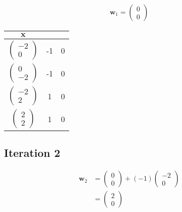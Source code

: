 \documentclass[11pt, a4paper]{article}
\begin{document}
\begin{align*}
	\boldsymbol{w}_1 = \begin{pmatrix} 0 \\ 0 \end{pmatrix}
\end{align*}

\begin{table}[htbp]
	\centering
	\begin{tabular}{|c|c|c|}
		\toprule
		$\boldsymbol{x}$    \\
		\midrule
		$\begin{pmatrix} -2 \\ 0 \end{pmatrix}$ & -1 & 0 \\
		$\begin{pmatrix} 0  \\ -2 \end{pmatrix}$ & -1 & 0 \\
		$\begin{pmatrix} -2 \\ 2 \end{pmatrix}$ & 1 & 0 \\
		$\begin{pmatrix} 2  \\ 2 \end{pmatrix}$ & 1 & 0 \\
		\hline
	\end{tabular}
\end{table}

\subsection{Iteration 2}

\begin{align*}
	\boldsymbol{w}_2 & = \begin{pmatrix} 0 \\ 0 \end{pmatrix} + (-1)  \begin{pmatrix} -2 \\ 0 \end{pmatrix}  \\
	                 & = \begin{pmatrix} 2 \\ 0 \end{pmatrix}
\end{align*}
\end{document}
